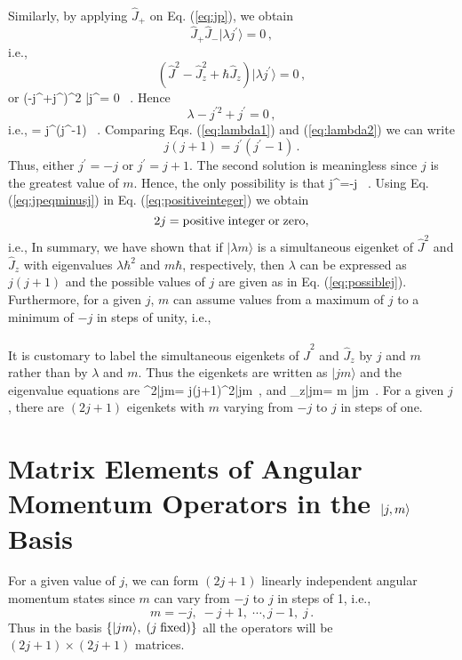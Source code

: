 \paragraph{}
Similarly, by applying $\hat{J}_{+}$ on Eq. (\ref{eq:jp}), we obtain
\[ \hat{J}_{+}\hat{J}_{-} |\lambda j^{\prime}\rangle = 0 \, , \]
i.e.,
\[ \left( \hat{J}^2-\hat{J}_z^2 + \hbar\hat{J}_z\right)|\lambda j^{\prime}\rangle = 0 \, , \]
or
\be
(\lambda-j^{}+j^{\prime})\hbar^2 |\lambda j^{\prime}\rangle = 0 \, .
\ee
Hence
\[ \lambda - j^{\prime 2}+j^{\prime} =0\, , \]
i.e.,
\be
\lambda = j^{\prime}(j^{\prime}-1) \, .
\label{eq:lambda2}
\ee
Comparing Eqs. (\ref{eq:lambda1}) and (\ref{eq:lambda2}) we can write
\[ j(j+1) = j^{\prime}(j^{\prime}-1) \, . \]
Thus, either $j^{\prime}=-j$ or $j^{\prime}=j+1$. The second solution is meaningless since $j$ is the greatest value of $m$.
Hence, the only possibility is that
\be
j^{\prime}=-j \, .
\label{eq:jpeqminusj}
\ee
Using Eq. (\ref{eq:jpeqminusj}) in Eq. (\ref{eq:positiveinteger}) we obtain
\[ 2j= {\rm positive\; integer\; or\; zero}, \]
i.e.,
\be
{}
\label{eq:possiblej}
\ee
In summary, we have shown that if $|\lambda m\rangle$ is a simultaneous eigenket of $\hat{J}^2$ and $\hat{J}_z$ with eigenvalues $\lambda \hbar^2$ and $m\hbar$, respectively, then $\lambda$ can be expressed as $j(j+1)$ and the possible values of $j$
are given as in Eq. (\ref{eq:possiblej}). Furthermore, for a given $j$, $m$ can assume values from a maximum of $j$ to a minimum of $-j$ in steps of unity, i.e.,
\be
{}
\ee

\paragraph{}
It is customary to label the simultaneous eigenkets of $\hat{J}^2$ and $\hat{J}_z$ by $j$ and $m$ rather than by $\lambda$ 
and $m$. Thus the eigenkets are written as $|jm\rangle$ and the eigenvalue equations are
\be
{}^2|jm\rangle = j(j+1)\hbar^2|jm\rangle \, ,
\ee
and
\be
{}_z|jm\rangle = m \hbar |jm\rangle\, . 
\ee
For a given $j$, there are $(2j+1)$ eigenkets with $m$ varying from $-j$ to $j$ in steps of one.

\section{Matrix Elements of Angular Momentum Operators in the \texorpdfstring{$\ket{j,m}$}{PDFstring} Basis}
For a given value of $j$, we can form $(2j+1)$ linearly independent angular momentum states since $m$ can
vary from $-j$ to $j$ in steps of 1, i.e.,
\[ m=-j,\; -j+1,\; \cdots , j-1,\; j\, .\]
Thus in the  basis $\{ |jm\rangle, \; (j\; {\rm fixed})\}$ all the operators will be $(2j+1)\times(2j+1)$ matrices.

